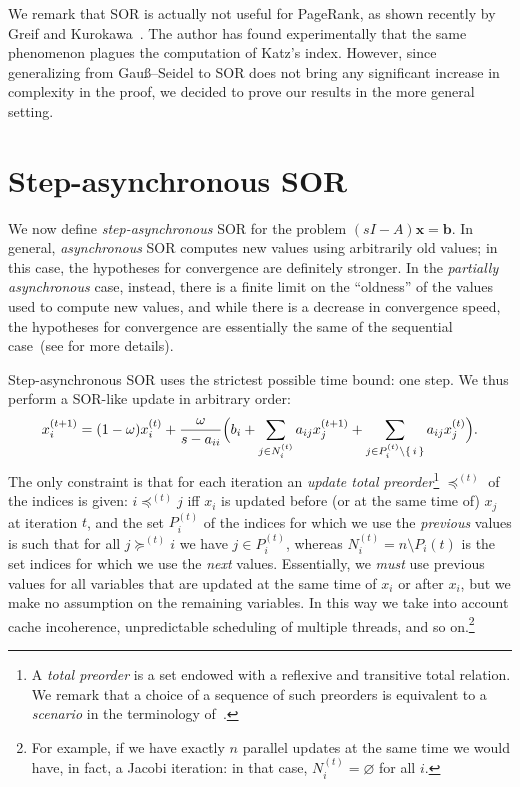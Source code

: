 \documentclass{article}
\newcommand{\x}{{\bm x}}
\newcommand{\Gauss}{Gau\ss}
\newcommand{\1}{\mathbf 1}
\renewcommand{\emptyset}{\varnothing}
\begin{document}
We remark that SOR is actually not useful for PageRank, as shown recently by
Greif and Kurokawa~\cite{GrKNCSPP}. The author has found experimentally that the
same phenomenon plagues the computation of Katz's index. However, since
generalizing from \Gauss--Seidel to SOR does not bring any significant increase
in complexity in the proof, we decided to prove our results in the more general
setting.

\section{Step-asynchronous SOR}
\label{sec:SOR}

We now define \emph{step-asynchronous} SOR for the problem $(s  I-A)\x=\bm b$.
In general, \emph{asynchronous} SOR computes new values using arbitrarily old values; in this case, the hypotheses for convergence
are definitely stronger. In the 
\emph{partially asynchronous} case, instead, there is a 
finite limit on the ``oldness'' of the values used to compute new values, and while there is a decrease
in convergence speed, the hypotheses for convergence are essentially the same of
the sequential case~(see \cite{BeTPDCNM} for more details).

Step-asynchronous SOR uses the strictest possible time bound: one step. We thus perform a SOR-like update in arbitrary order:
\begin{equation}
\label{eq:gs}
x_i^{(t+1)} = (1-\omega)x_i^{(t)}+
\frac\omega{s -a_{ii}}\Bigl(b_i+\sum_{j\in N_i^{(t)}}a_{ij}x_j^{(t+1)}+
\sum_{j\in P_i^{(t)}\setminus\{\,i\,\}}a_{ij}x_j^{(t)}\Bigr). 
\end{equation}
The only constraint 
is that for each iteration an \emph{update total preorder}\footnote{A \emph{total preorder} is a 
set endowed with a reflexive and transitive total relation. We remark that a choice of a sequence
of such preorders is equivalent to a \emph{scenario} in the terminology of~\cite{BeTPDCNM}.} $\preceq^{(t)}$ of
the indices is given: $i\preceq^{(t)} j$ iff $x_i$ is updated before (or at the
same time of) $x_j$ at iteration $t$, and the set
$P_i^{(t)}$ of the indices for which we use the \emph{previous}
values is such that for all $j\succeq^{(t)} i$ we have $j\in P_i^{(t)}$, whereas
$N_i^{(t)}= n\setminus P_i{(t)}$ is the set indices for which we use the \emph{next}
values. Essentially,
we \emph{must} use previous values for all variables that are updated at the
same time of $x_i$ or after $x_i$, but we make no assumption on the remaining
variables. In this way we take into account cache incoherence, unpredictable
scheduling of multiple threads, and so on.\footnote{For example, if we have
exactly $n$ parallel updates at the same time we would have, in fact, a Jacobi
iteration: in that case, $N_i^{(t)}=\emptyset$ for all $i$.}
\end{document}

